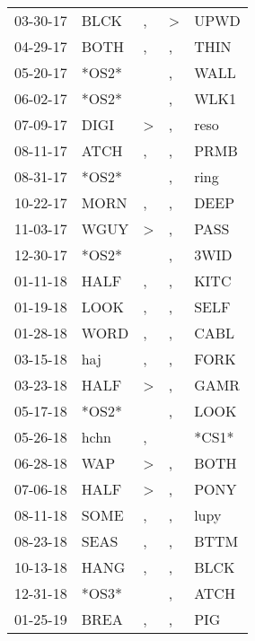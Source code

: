 \begin{supertabular}{lllll}
 03-30-17 &   BLCK &                , &     \textgreater &   UPWD \\
 04-29-17 &   BOTH &                , &                , &   THIN \\
 05-20-17 &  *OS2* &                  &                , &   WALL \\
 06-02-17 &  *OS2* &                  &                , &   WLK1 \\
 07-09-17 &   DIGI &     \textgreater &                , &   reso \\
 08-11-17 &   ATCH &                , &                , &   PRMB \\
 08-31-17 &  *OS2* &                  &                , &   ring \\
 10-22-17 &   MORN &                , &                , &   DEEP \\
 11-03-17 &   WGUY &     \textgreater &                , &   PASS \\
 12-30-17 &  *OS2* &                  &                , &   3WID \\
 01-11-18 &   HALF &                , &                , &   KITC \\
 01-19-18 &   LOOK &                , &                , &   SELF \\
 01-28-18 &   WORD &                , &                , &   CABL \\
 03-15-18 &    haj &                , &                , &   FORK \\
 03-23-18 &   HALF &     \textgreater &                , &   GAMR \\
 05-17-18 &  *OS2* &                  &                , &   LOOK \\
 05-26-18 &   hchn &                , &                  &  *CS1* \\
 06-28-18 &    WAP &     \textgreater &                , &   BOTH \\
 07-06-18 &   HALF &     \textgreater &                , &   PONY \\
 08-11-18 &   SOME &                , &                , &   lupy \\
 08-23-18 &   SEAS &                , &                , &   BTTM \\
 10-13-18 &   HANG &                , &                , &   BLCK \\
 12-31-18 &  *OS3* &                  &                , &   ATCH \\
 01-25-19 &   BREA &                , &                , &    PIG \\

\end{supertabular}
